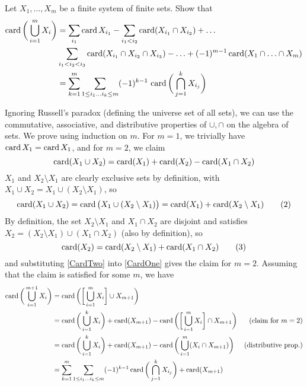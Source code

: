   \begin{exercise}[Zorich 2.4.6]
    Let $X_1, \ldots, X_m$ be a finite system of finite sets. Show that 
    \begin{align*}
      \operatorname{card} \bigg( \bigcup_{i=1}^m X_i \bigg) & = \sum_{i_1} \operatorname{card}{X_{i_1}} - \sum_{i_1 < i_2} \operatorname{card}(X_{i_1} \cap X_{i_2}) + \ldots \\
      & \sum_{i_1 < i_2 < i_3} \operatorname{card}(X_{i_1} \cap X_{i_2} \cap X_{i_3}) - \ldots + (-1)^{m-1} \operatorname{card} (X_1 \cap \ldots \cap X_m) \\
      & = \sum_{k=1}^{m} \sum_{1 \leq i_1 \ldots i_k \leq m} (-1)^{k-1} \, \operatorname{card}\bigg( \bigcap_{j=1}^k X_{i_j} \bigg)
    \end{align*}
  \end{exercise}
  \begin{solution}
    Ignoring Russell's paradox (defining the universe set of all sets), we can use the commutative, associative, and distributive properties of $\cup, \cap$ on the algebra of sets. We prove using induction on $m$. For $m=1$, we trivially have $\operatorname{card}{X_1} = \operatorname{card}{X_1}$, and for $m = 2$, we claim 
    \[\operatorname{card}( X_1 \cup X_2) = \operatorname{card}(X_1) + \operatorname{card}(X_2) - \operatorname{card}(X_1 \cap X_2)\]
    $X_1$ and $X_2 \setminus X_1$ are clearly exclusive sets by definition, with $X_1 \cup X_2 = X_1 \cup (X_2 \setminus X_1)$, so 
    \[\operatorname{card}(X_1 \cup X_2) = \operatorname{card}\big( X_1 \cup (X_2 \setminus X_1) \big) = \operatorname{card}(X_1) + \operatorname{card}(X_2 \setminus X_1) \tag{2} \label{CardOne}\]
    By definition, the set $X_2 \setminus X_1$ and $X_1 \cap X_2$ are disjoint and satisfies $X_2 = (X_2 \setminus X_1) \cup (X_1 \cap X_2)$ (also by definition), so 
    \[\operatorname{card}(X_2) = \operatorname{card}(X_2 \setminus X_1) + \operatorname{card}(X_1 \cap X_2) \tag{3} \label{CardTwo}\]
    and substituting \eqref{CardTwo} into \eqref{CardOne} gives the claim for $m=2$. Assuming that the claim is satisfied for some $m$, we have 
    \begin{align*}
      \card \bigg( \bigcup_{i=1}^{m+1} X_i \bigg) & = \card \bigg( \bigg[ \bigcup_{i=1}^m X_i \bigg] \cup X_{m+1} \bigg) & \\
      & = \card \bigg( \bigcup_{i=1}^k X_i \bigg) + \card(X_{m+1}) - \card\bigg( \bigg[ \bigcup_{i=1}^m X_i\bigg] \cap X_{m+1} \bigg) & (\text{claim for } m=2) \\
      & = \card \bigg( \bigcup_{i=1}^k X_i \bigg) + \card(X_{m+1}) - \card\bigg(\bigcup_{i=1}^m (X_i \cap X_{m+1}) \bigg) & (\text{distributive prop.})  \\
      & = \sum_{k=1}^m \sum_{1 \leq i_1 \ldots i_k \leq m} (-1)^{k-1} \card\bigg( \bigcap_{j=1}^k X_{i_j} \bigg) + \card(X_{m+1}) \\ 

\end{align*}
\end{solution}
